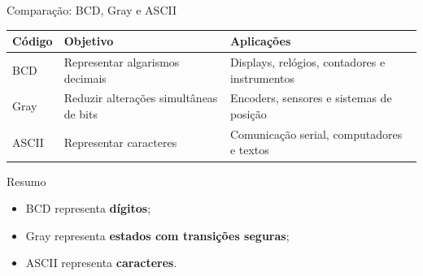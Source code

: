 \begin{frame}{Comparação: BCD, Gray e ASCII}
    \small

    \begin{center}
        \begin{tabular}{p{2cm}|p{3.2cm}|p{4.5cm}}
            \textbf{Código} &
            \textbf{Objetivo} &
            \textbf{Aplicações} \\ \hline

            BCD &
            Representar algarismos decimais &
            Displays, relógios, contadores e instrumentos \\[0.3cm]

            Gray &
            Reduzir alterações simultâneas de bits &
            Encoders, sensores e sistemas de posição \\[0.3cm]

            ASCII &
            Representar caracteres &
            Comunicação serial, computadores e textos
        \end{tabular}
    \end{center}

    \vspace{0.3cm}

    \begin{alertblock}{Resumo}
        \begin{itemize}
            \item BCD representa \textbf{dígitos};
            \item Gray representa \textbf{estados com transições seguras};
            \item ASCII representa \textbf{caracteres}.
        \end{itemize}
    \end{alertblock}

\end{frame}
